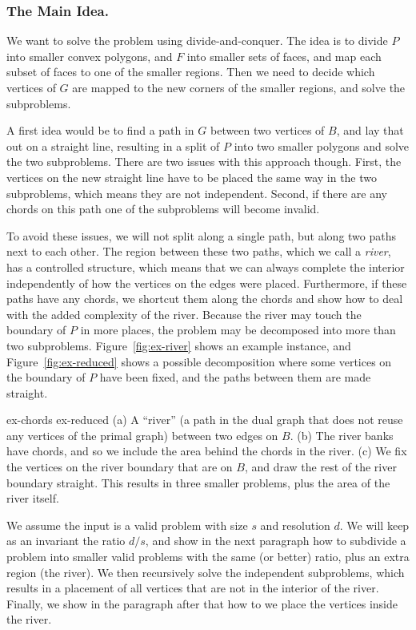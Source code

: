 \documentclass[11pt]{article}
\newif\ifFull
\renewcommand{\subsection}[1]{\subsubsection{#1.}}
\begin{document}
  \subsection {The Main Idea}

    We want to solve the problem using divide-and-conquer.
    The idea is to divide $P$ into smaller convex polygons, and $F$ into smaller
    sets of faces, and map each subset of faces to one of the smaller regions.
    Then we need to decide which vertices of $G$ are mapped to the new corners
    of the smaller regions, and solve the subproblems.

    A first idea would be
    to find a path in $G$ between two vertices of $B$, and lay that out on a
    straight line, resulting in a split of $P$ into two smaller polygons and solve
    the two subproblems. There are two issues with this approach though. First, the
    vertices on the new straight line have to be placed the same way in the two
    subproblems, which means they are not independent. Second, if there are any
    chords on this path one of the subproblems will become invalid.

    To avoid these issues, we will not split along a single path, but along two
    paths next to each other. The region between these two paths, which we call a
    \emph {river}, has a controlled structure, which means that we can always
    complete the interior independently of how the vertices on the edges were
    placed. Furthermore, if these paths have any chords, we shortcut them along
    the chords and show how to deal with the added complexity of the river.
    Because the river may touch the boundary of $P$ in more places, the problem
    may be decomposed into more than two subproblems.
    Figure~\ref {fig:ex-river} shows an example instance,
    and Figure~\ref {fig:ex-reduced} shows
    a possible decomposition where some vertices on the boundary of $P$ have been
    fixed, and the paths between them are made straight.

     {ex-chords} {ex-reduced}
    {(a) A ``river'' (a path in the dual graph that does not reuse any vertices of
    the primal graph) between two edges on $B$. (b) The river banks have chords, and so 
    we include the area behind the chords in the river. (c) We fix the vertices on
    the river boundary that are on $B$, and draw the rest of the river boundary
    straight. This results in three smaller problems, plus the area of the river
    itself.}

    We assume the input is a valid problem with size $s$ and resolution $d$.
    We will keep as an invariant the ratio $d/s$, and show in
    \ifFull Section~\ref {sec:split} \else the next paragraph \fi
    how to
    subdivide a problem into smaller valid problems with the same (or better)
    ratio, plus an extra region (the river). We then recursively solve the
    independent subproblems, which results in a placement of all vertices
    that are not in the interior of the river. Finally, we show in
    \ifFull Section~\ref {sec:river} \else the paragraph after that \fi
    how to we place the vertices inside the river.
\end{document}
